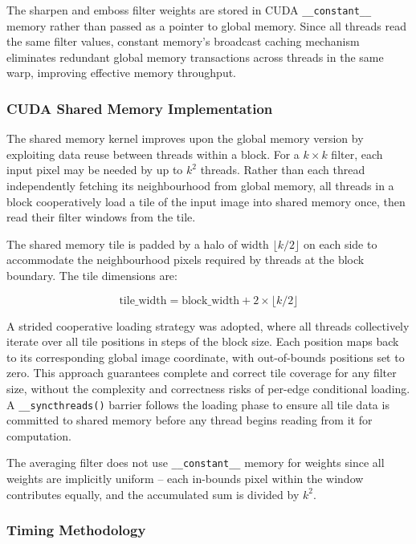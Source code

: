 The sharpen and emboss filter weights are stored in CUDA \texttt{\_\_constant\_\_} memory rather than passed as a pointer to global memory. Since all threads read the same filter values, constant memory's broadcast caching mechanism eliminates redundant global memory transactions across threads in the same warp, improving effective memory throughput.

\subsubsection{CUDA Shared Memory Implementation}

The shared memory kernel improves upon the global memory version by exploiting data reuse between threads within a block. For a $k \times k$ filter, each input pixel may be needed by up to $k^2$ threads. Rather than each thread independently fetching its neighbourhood from global memory, all threads in a block cooperatively load a tile of the input image into shared memory once, then read their filter windows from the tile.

The shared memory tile is padded by a halo of width $\lfloor k/2 \rfloor$ on each side to accommodate the neighbourhood pixels required by threads at the block boundary. The tile dimensions are:

\begin{equation}
\text{tile\_width} = \text{block\_width} + 2 \times \lfloor k/2 \rfloor
\end{equation}

A strided cooperative loading strategy was adopted, where all threads collectively iterate over all tile positions in steps of the block size. Each position maps back to its corresponding global image coordinate, with out-of-bounds positions set to zero. This approach guarantees complete and correct tile coverage for any filter size, without the complexity and correctness risks of per-edge conditional loading. A \texttt{\_\_syncthreads()} barrier follows the loading phase to ensure all tile data is committed to shared memory before any thread begins reading from it for computation.

The averaging filter does not use \texttt{\_\_constant\_\_} memory for weights since all weights are implicitly uniform -- each in-bounds pixel within the window contributes equally, and the accumulated sum is divided by $k^2$.

\subsubsection{Timing Methodology}

